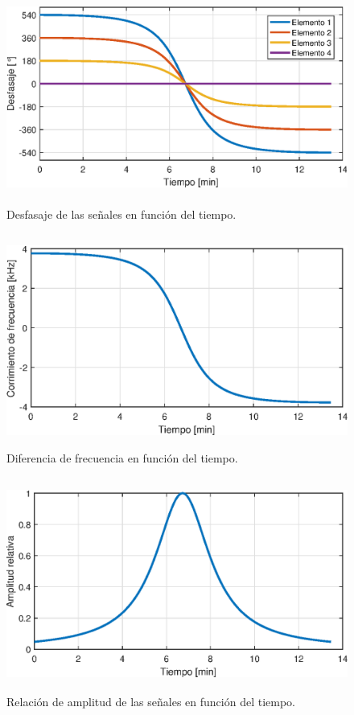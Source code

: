 \documentclass{article}
\newenvironment{standalone}{\begin{preview}}{\end{preview}}
\begin{document}
\begin{standalone}
  \begin{figure}[!htbp]
    \centering
    \includegraphics[width=\linewidth, height=70mm, keepaspectratio]{../images/t-phase-offset.eps}
    \caption{Desfasaje de las señales en función del tiempo.}
    \label{fig:t-phase-offset}
  \end{figure}

  \begin{figure}[!htbp]
    \centering
    \includegraphics[width=\linewidth, height=70mm, keepaspectratio]{../images/t-frequency-shift.eps}
    \caption{Diferencia de frecuencia en función del tiempo.}
    \label{fig:t-frequency-shift}
  \end{figure}

  \begin{figure}[!htbp]
    \centering
    \includegraphics[width=\linewidth, height=70mm, keepaspectratio]{../images/t-relative-amplitude.eps}
    \caption{Relación de amplitud de las señales en función del tiempo.}
    \label{fig:t-relative-amplitude}
  \end{figure}

\end{standalone}
\end{document}
